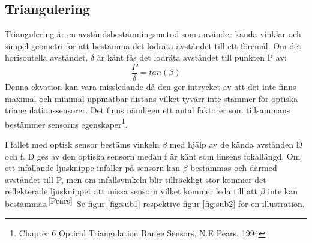 \documentclass[a4paper,12pt,fleqn]{article}
\begin{document}
\subsection{Triangulering}
Triangulering är en avståndsbestämningsmetod som använder kända vinklar och simpel geometri för att bestämma det lodräta avståndet till ett föremål.
Om det horisontella avståndet, \begin{math}\delta\end{math} är känt fås det lodräta avståndet till punkten P av:
\begin{equation}
\label{eq:angle}
\frac{P}{\delta}=tan(\beta)
\end{equation}
Denna ekvation kan vara missledande då den ger intrycket av att det inte finns maximal och minimal uppmätbar distans vilket tyvärr inte stämmer för optiska triangulationssensorer.
Det finns nämligen ett antal faktorer som tillsammans bestämmer sensorns egenskaper\footnote{\label{Pears}Chapter 6 Optical Triangulation Range Sensors, N.E Pears, 1994}.

I fallet med optisk sensor bestäms vinkeln \begin{math}\beta\end{math} med hjälp av de kända avstånden D och f. D ges av den optiska sensorn medan f är känt som linsens fokallängd. Om ett infallande ljusknippe infaller på sensorn kan \begin{math}\beta\end{math} bestämmas och därmed avståndet till P, men om  infallsvinkeln blir tillräckligt stor kommer det reflekterade ljusknippet att missa sensorn vilket kommer leda till att \begin{math}\beta\end{math} inte kan bestämmas.$^{\ref{Pears}}$ Se figur \ref{fig:sub1} respektive figur \ref{fig:sub2} för en illustration.
\end{document}
